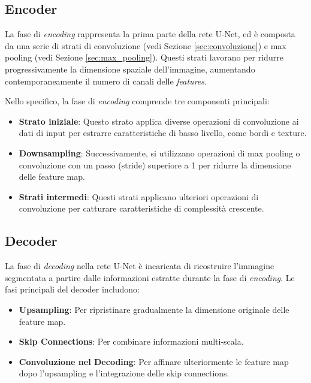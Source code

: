 \subsection{Encoder}
\label{sec:Encoder}

La fase di \textit{encoding} rappresenta la prima parte della rete U-Net, ed è composta da una serie
di strati di convoluzione (vedi Sezione \ref{sec:convoluzione}) e max pooling (vedi Sezione
\ref{sec:max_pooling}). Questi strati lavorano per ridurre progressivamente la dimensione spaziale
dell'immagine, aumentando contemporaneamente il numero di canali delle \textit{features}.

Nello specifico, la fase di \textit{encoding} comprende tre componenti principali:
\begin{itemize}
  \item \textbf{Strato iniziale}: Questo strato applica diverse operazioni di convoluzione ai dati
      di input per estrarre caratteristiche di basso livello, come bordi e texture.
  \item \textbf{Downsampling}: Successivamente, si utilizzano operazioni di max pooling o
      convoluzione con un passo (stride) superiore a 1 per ridurre la dimensione delle feature map.
  \item \textbf{Strati intermedi}: Questi strati applicano ulteriori operazioni di convoluzione per
      catturare caratteristiche di complessità crescente.
\end{itemize}


\subsection{Decoder}
\label{sec:Decoder}

La fase di \textit{decoding} nella rete U-Net è incaricata di ricostruire l'immagine segmentata a
partire dalle informazioni estratte durante la fase di \textit{encoding}. Le fasi principali del
decoder includono:
\begin{itemize}
  \item \textbf{Upsampling}: Per ripristinare gradualmente la dimensione originale delle feature map.
  \item \textbf{Skip Connections}: Per combinare informazioni multi-scala.
  \item \textbf{Convoluzione nel Decoding}: Per affinare ulteriormente le feature map dopo
      l'upsampling e l'integrazione delle skip connections.
\end{itemize}

